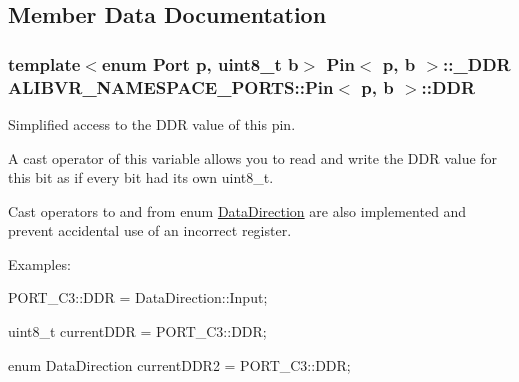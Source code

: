 \subsection{Member Data Documentation}
\subsubsection[{\texorpdfstring{D\+DR}{DDR}}]{\setlength{\rightskip}{0pt plus 5cm}template$<$enum Port p, uint8\+\_\+t b$>$ {\bf Pin}$<$ p, b $>$\+::{\bf \+\_\+\+D\+DR} {\bf A\+L\+I\+B\+V\+R\+\_\+\+N\+A\+M\+E\+S\+P\+A\+C\+E\+\_\+\+P\+O\+R\+T\+S\+::\+Pin}$<$ p, b $>$\+::D\+DR\hspace{0.3cm}{\ttfamily [static]}}\hypertarget{structALIBVR__NAMESPACE__PORTS_1_1Pin_a91515b99dfbd7423ffa4771ec32bfbe8}{}\label{structALIBVR__NAMESPACE__PORTS_1_1Pin_a91515b99dfbd7423ffa4771ec32bfbe8}


Simplified access to the D\+DR value of this pin. 

A cast operator of this variable allows you to read and write the D\+DR value for this bit as if every bit had its own uint8\+\_\+t.

Cast operators to and from enum \hyperlink{namespaceALIBVR__NAMESPACE__PORTS_a1c84bd36a7c4d1204c926927f8534ed4}{Data\+Direction} are also implemented and prevent accidental use of an incorrect register.

Examples\+:


\begin{DoxyItemize}
\item {\ttfamily P\+O\+R\+T\+\_\+\+C3\+::\+D\+DR = Data\+Direction\+::\+Input;}
\item {\ttfamily uint8\+\_\+t current\+D\+DR = P\+O\+R\+T\+\_\+\+C3\+::\+D\+DR;}
\item {\ttfamily enum Data\+Direction current\+D\+D\+R2 = P\+O\+R\+T\+\_\+\+C3\+::\+D\+DR;} 
\end{DoxyItemize}
